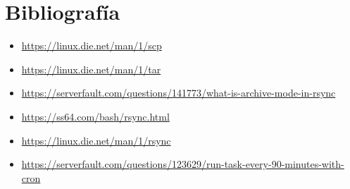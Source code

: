 \documentclass[twoside]{article}
\begin{document}
\begin{figure}[H]
    \centering
    \begin{subfigure}{.5\textwidth}
        \centering
    \end{subfigure}%
    \begin{subfigure}{.5\textwidth}
        \centering
    \end{subfigure}
\end{figure}


\newpage
\section{Bibliografía}
\begin{itemize}
    \item \url{https://linux.die.net/man/1/scp}
    \item \url{https://linux.die.net/man/1/tar}
    \item \url{https://serverfault.com/questions/141773/what-is-archive-mode-in-rsync}
    \item \url{https://ss64.com/bash/rsync.html}
    \item \url{https://linux.die.net/man/1/rsync}
    \item \url{https://serverfault.com/questions/123629/run-task-every-90-minutes-with-cron}
\end{itemize}
\end{document}
